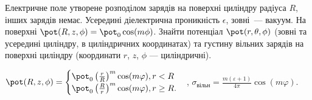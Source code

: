 \begin{problem}
Електричне поле утворене розподілом зарядів на поверхні циліндру радіуса $R$, інших зарядів немає. Усередині діелектрична проникність $\epsilon$, зовні~--- вакуум. На поверхні $\pot(R,z,\phi) = \pot_0\cos(m\phi)$. Знайти потенціал $\pot(r,\theta,\phi) $ (зовні та усередині циліндру, в циліндричних координатах) та густину вільних зарядів на поверхні циліндру (координати $r$, $z$, $\phi$ --- циліндричні).
\begin{solution}
	\(
		\pot(R,z,\phi) =
		\begin{cases}
			\pot _0\left( \frac{r}{R} \right)^m\cos (m\varphi), r < R \\
			\pot _0\left( \frac{R}{r} \right)^m\cos (m\varphi), r \ge R.
		\end{cases}
	\),
	\(
		\sigma_\text{вільн} = \frac{m(\varepsilon  + 1)}{4\pi }\cos (m\varphi ).
	\)
\end{solution}
\end{problem}

